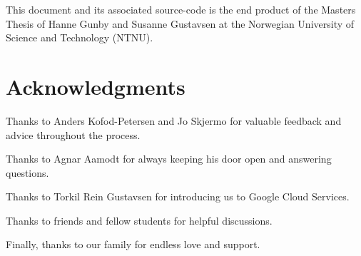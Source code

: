 
This document and its associated source-code is the end product of the Masters Thesis of Hanne Gunby and Susanne Gustavsen at the Norwegian University of Science and Technology (NTNU). 


\section*{Acknowledgments}

Thanks to Anders Kofod-Petersen and Jo Skjermo for valuable feedback and advice throughout the process.

Thanks to Agnar Aamodt for always keeping his door open and answering questions.

Thanks to Torkil Rein Gustavsen for introducing us to Google Cloud Services.

Thanks to friends and fellow students for helpful discussions.

Finally, thanks to our family for endless love and support.